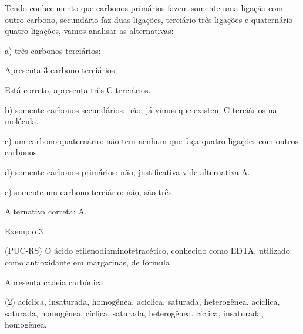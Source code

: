 \documentclass[presentation,professionalfonts,aspectratio=169]{beamer}
\begin{document}
\begin{frame}[label={sec:orgdb3fa8f}]{}
\begin{answer}[print=true]
\scriptsize
Tendo conhecimento que carbonos primários fazem somente uma ligação com outro carbono, secundário faz duas ligações, terciário três ligações e quaternário quatro ligações, vamos analisar as alternativas:

a) três carbonos terciários:



Apresenta \alert{3 carbono terciários}

Está correto, apresenta três C terciários.

b) somente carbonos secundários: não, já vimos que existem C terciários na molécula.

c) um carbono quaternário: não tem nenhum que faça quatro ligações com outros carbonos.

d) somente carbonos primários: não, justificativa vide alternativa A.

e) somente um carbono terciário: não, são três.

Alternativa correta: \alert{A}.
\end{answer}
\end{frame}
\begin{frame}[label={sec:org3ff67f9}]{Exemplo 3}
\begin{question}
\scriptsize
(\alert{PUC-RS}) O ácido etilenodiaminotetracético, conhecido como \alert{EDTA}, utilizado como antioxidante em margarinas, de fórmula


Apresenta cadeia carbônica

\begin{choice}(2)
\choice acíclica, insaturada, homogênea.
\choice acíclica, saturada, heterogênea.
\choice acíclica, saturada, homogênea.
\choice cíclica, saturada, heterogênea.
\choice cíclica, insaturada, homogênea.
\end{choice}
\end{question}
\end{frame}
\end{document}

